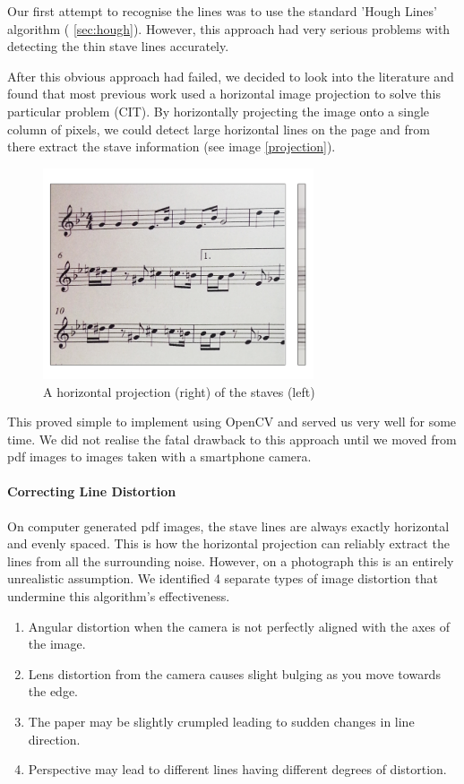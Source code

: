 Our first attempt to recognise the lines was to use the standard 'Hough Lines' algorithm ( \autoref{sec:hough}). However, this approach had very serious problems with detecting the thin stave lines accurately.

After this obvious approach had failed, we decided to look into the literature and found that most previous work used a horizontal image projection to solve this particular problem (CIT). By horizontally projecting the image onto a single column of pixels, we could detect large horizontal lines on the page and from there extract the stave information (see image \ref{projection}).

\begin{figure}[h!]
    \centering
    \includegraphics[width=80mm]{./assets/projection.png}
    \caption{A horizontal projection (right) of the staves (left)}
    \label{image:projection}
\end{figure}

This proved simple to implement using OpenCV and served us very well for some time. We did not realise the fatal drawback to this approach until we moved from pdf images to images taken with a smartphone camera. 

\paragraph{Correcting Line Distortion}

On computer generated pdf images, the stave lines are always exactly horizontal and evenly spaced. This is how the horizontal projection can reliably extract the lines from all the surrounding noise. However, on a photograph this is an entirely unrealistic assumption. We identified 4 separate types of image distortion that undermine this algorithm's effectiveness.

\begin{enumerate}
\item{Angular distortion when the camera is not perfectly aligned with the axes of the image.}
\item{Lens distortion from the camera causes slight bulging as you move towards the edge.}
\item{The paper may be slightly crumpled leading to sudden changes in line direction.}
\item{Perspective may lead to different lines having different degrees of distortion.}
\end{enumerate}

